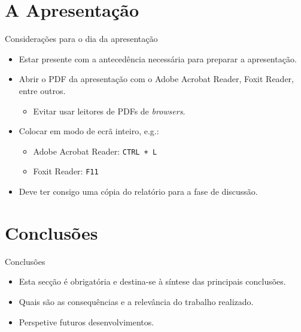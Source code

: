 \documentclass[
aspectratio=169,	%
LEEC,				%
portuguese,			%
]{DEEclassP}
\begin{document}
\section{A Apresentação}
\begin{frame}[fragile]{Considerações para o dia da apresentação}

\setlstep{0.3cm}{0cm}{0cm}
\begin{itemize}
	\item Estar presente com a antecedência necessária para preparar a apresentação.
	\item Abrir o PDF da apresentação com o Adobe Acrobat Reader, Foxit Reader, entre outros.
	\begin{itemize}
		\item Evitar usar leitores de PDFs de \textit{browsers}.
	\end{itemize} 
	\item Colocar em modo de ecrã inteiro, e.g.:
	\begin{itemize}
		\item Adobe Acrobat Reader: \verb|CTRL + L|
		\item Foxit Reader: \verb|F11|
	\end{itemize}	
	\item Deve ter consigo uma cópia do relatório para a fase de discussão.
\end{itemize}
	
\end{frame}

\section{Conclusões}

\begin{frame}{Conclusões}

\setlstep{0.5cm}{0cm}{0cm}
\begin{itemize}
	\item Esta secção é obrigatória e destina-se à síntese das principais conclusões.

	\item Quais são as consequências e a relevância do trabalho realizado.

	\item Perspetive futuros desenvolvimentos. 
\end{itemize}
	
\end{frame}
\end{document}
